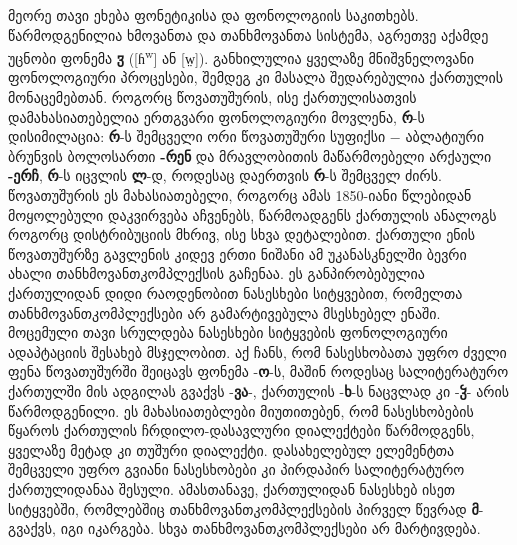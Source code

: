 \begin{otherlanguage}{georgian}
	მეორე თავი ეხება ფონეტიკისა და ფონოლოგიის საკითხებს. წარმოდგენილია ხმოვანთა და თანხმოვანთა სისტემა, აგრეთვე  აქამდე უცნობი ფონემა \textbf{ჳ} ([ɦ\textsuperscript{w}] ან [w̤]). განხილულია ყველაზე მნიშვნელოვანი ფონოლოგიური პროცესები, შემდეგ კი მასალა შედარებულია ქართულის მონაცემებთან. როგორც წოვათუშურის, ისე ქართულისათვის დამახასიათებელია ერთგვარი ფონოლოგიური მოვლენა, \textbf{რ}-ს დისიმილაცია:  \textbf{რ}-ს შემცველი ორი წოვათუშური სუფიქსი − აბლატიური ბრუნვის ბოლოსართი  \textbf{-რენ} და მრავლობითის მაწარმოებელი არქაული \textbf{-ერჩ}, \textbf{რ}-ს იცვლის \textbf{ლ}-დ, როდესაც დაერთვის \textbf{რ}-ს შემცველ ძირს. წოვათუშურის ეს მახასიათებელი, როგორც ამას 1850-იანი წლებიდან მოყოლებული დაკვირვება აჩვენებს, წარმოადგენს ქართულის ანალოგს როგორც დისტრიბუციის მხრივ, ისე სხვა დეტალებით. ქართული ენის წოვათუშურზე გავლენის კიდევ ერთი ნიშანი ამ  უკანასკნელში ბევრი ახალი თანხმოვანთკომპლექსის გაჩენაა. ეს განპირობებულია ქართულიდან დიდი რაოდენობით ნასესხები სიტყვებით, რომელთა თანხმოვანთკომპლექსები არ გამარტივებულა მსესხებელ ენაში. მოცემული თავი სრულდება  ნასესხები სიტყვების ფონოლოგიური ადაპტაციის შესახებ მსჯელობით. აქ ჩანს, რომ ნასესხობათა უფრო ძველი ფენა წოვათუშურში შეიცავს ფონემა -\textbf{ო}-ს, მაშინ როდესაც სალიტერატურო ქართულში მის ადგილას გვაქვს -\textbf{ვა}-,   ქართულის -\textbf{ხ}-ს ნაცვლად კი -\textbf{ჴ}- არის წარმოდგენილი. ეს მახასიათებლები მიუთითებენ, რომ ნასესხობების წყაროს ქართულის ჩრდილო-დასავლური დიალექტები წარმოდგენს, ყველაზე მეტად კი თუშური დიალექტი. დასახელებულ ელემენტთა შემცველი უფრო გვიანი ნასესხობები კი პირდაპირ სალიტერატურო ქართულიდანაა შესული. ამასთანავე, ქართულიდან ნასესხებ ისეთ სიტყვებში, რომლებშიც თანხმოვანთკომპლექსების პირველ წევრად \textbf{მ}- გვაქვს, იგი  იკარგება. სხვა თანხმოვანთკომპლექსები არ მარტივდება.



\end{otherlanguage}
